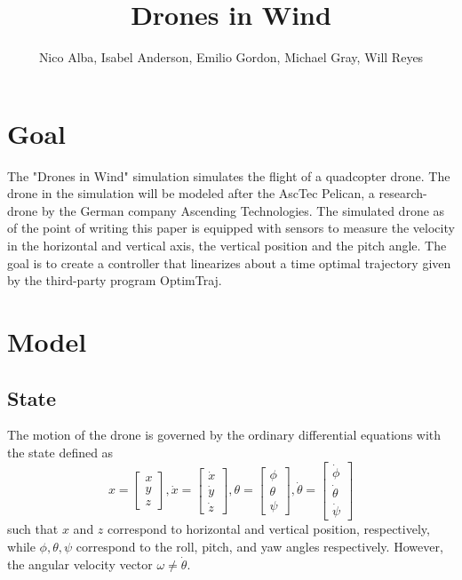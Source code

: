 \documentclass[12pt]{article}
\title{Drones in Wind}
\author{Nico Alba, Isabel Anderson, Emilio Gordon, Michael Gray, Will Reyes}
\begin{document}
\maketitle


\section{Goal}
The "Drones in Wind" simulation simulates the flight of a quadcopter drone. The drone in the simulation will be modeled after the AscTec Pelican, a research-drone by the German company Ascending Technologies. The simulated drone as of the point of writing this paper is equipped with sensors to measure the velocity in the horizontal and vertical axis, the vertical position and the pitch angle. The goal is to create a controller that linearizes about a time optimal trajectory given by the third-party program OptimTraj.
\section{Model}
\subsection{State}
The motion of the drone is governed by the ordinary differential equations with the state defined as
\begin{equation}
\label{state}
x = \begin{bmatrix} x\\y\\z \end{bmatrix},
\dot{x} = \begin{bmatrix} \dot{x} \\ \dot{y}\\ \dot{z} \end{bmatrix},
\theta = \begin{bmatrix} \phi\\ \theta\\ \psi \end{bmatrix},
\dot{\theta} = \begin{bmatrix} \dot{\phi} \\ \dot{\theta}\\ \dot{\psi} \end{bmatrix}
\end{equation}
such that $x$ and $z$ correspond to horizontal and vertical position, respectively, while $\phi, \theta, \psi$ correspond to the roll, pitch, and yaw angles respectively. However, the angular velocity vector $\omega \neq \dot{\theta}$. 
\end{document}
